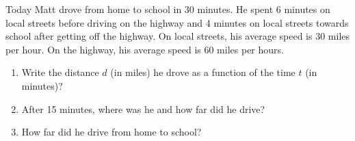 \vfill
\begin{center}
\hfill
{}
\end{center}

\newpage

\begin{exercise}
  Today Matt drove from home to school in 30 minutes. He spent 6 minutes on  local streets before driving on the highway and 4 minutes on local streets towards school after getting off the highway. On local streets, his average speed is 30 miles per hour. On the highway, his average speed is 60 miles per hours. 
\begin{enumerate}[label={\textup{(\arabic*)~}}]
\item Write the distance $d$ (in miles) he drove as a function of the time $t$ (in minutes)? 
\item After 15 minutes, where was he and how far did he drive?
\item How far did he drive from home to school?
\end{enumerate}
\end{exercise}


\vfill
\begin{center}
\hfill
\raisebox{0.4em}{
  \rotatebox{\rotationdegree}{
    \parbox{\textwidth}{
      \begin{enumerate*}[label={\theexer~(\arabic*)~}]
        \item 
        $d=\begin{cases}
\frac12t & ~\text{if}~ 0\leq t\leq 6 \\ 
(t-6)+3 & ~\text{if}~ 6< t \le 26 \\
\frac12(t-26)+23 & ~\text{if}~ 26< t \le 30
        \end{cases}
        $
        \item $12$ miles
        \item $25$ miles
        \hfill\null
      \end{enumerate*}
    }
  }
}
\end{center}
